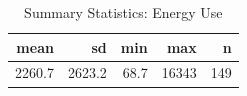 \begin{table}

\caption{Summary Statistics: Energy Use}
\centering
\begin{tabular}[t]{rrrrr}
\toprule
mean & sd & min & max & n\\
\midrule
2260.7 & 2623.2 & 68.7 & 16343 & 149\\
\bottomrule
\end{tabular}
\end{table}
